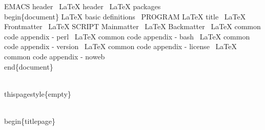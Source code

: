 \documentclass[11pt]{article}
\def\nwendcode{\endtrivlist \endgroup} %
\let\nwdocspar=\par                    %
\begin{document}
\nwenddocs{}\endmoddef
\LA{}EMACS header~{\nwtagstyle{}}\RA{}
\LA{}LaTeX header~{\nwtagstyle{}}\RA{}
\LA{}LaTeX packages~{\nwtagstyle{}}\RA{}
%
%
\\begin\{document\}
%
\LA{}LaTeX basic definitions~{\nwtagstyle{}}\RA{}
\LA{}PROGRAM LaTeX title~{\nwtagstyle{}}\RA{}
%
\LA{}LaTeX Frontmatter~{\nwtagstyle{}}\RA{}
\LA{}LaTeX SCRIPT Mainmatter~{\nwtagstyle{}}\RA{}
\LA{}LaTeX Backmatter~{\nwtagstyle{}}\RA{}
%
\LA{}LaTeX common code appendix - perl~{\nwtagstyle{}}\RA{}
\LA{}LaTeX common code appendix - bash~{\nwtagstyle{}}\RA{}
\LA{}LaTeX common code appendix - version~{\nwtagstyle{}}\RA{}
\LA{}LaTeX common code appendix - license~{\nwtagstyle{}}\RA{}
\LA{}LaTeX common code appendix - noweb~{\nwtagstyle{}}\RA{}
%
\\end\{document\}
%
\nwendcode{}\nwdocspar

\nwenddocs{}\endmoddef
\\thispagestyle\{empty\}

\\begin\{titlepage\}
\end{document}
